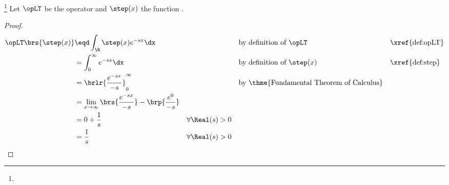\begin{theorem}
\footnote{
  }
\label{thm:opLT_step}
Let $\opLT$ be the  operator 
and $\step(x)$ the  function .
\end{theorem}
\begin{proof}
\begin{align*}
  \opLT\brs{\step(x)}
    &\eqd \int_\R \step(x) e^{-sx}\dx
    &&
    && \text{by definition of $\opLT$}
    && \text{\xref{def:opLT}}
  \\&= \int_0^{\infty}  e^{-sx}\dx
    &&
    && \text{by definition of $\step(x)$}
    && \text{\xref{def:step}}
  \\&= \brlr{\frac{e^{-sx}}{-s}}_0^{\infty}
    &&
    && \text{by \thme{Fundamental Theorem of Calculus}}
  \\&= \lim_{x\to\infty}\brs{\frac{e^{-sx}}{-s}} - \brp{\frac{e^0}{-s}}
  \\&= 0 + \frac{1}{s}
    && \forall\Real(s) > 0
  \\&= \frac{1}{s}
    && \forall\Real(s) > 0
\end{align*}
\end{proof}

